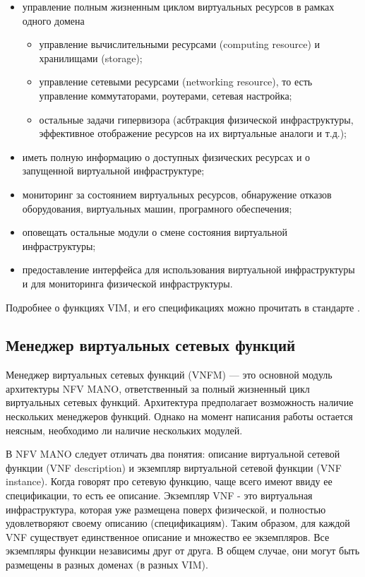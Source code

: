 \documentclass[oneside,final,14pt,a4paper]{extreport}
\begin{document}
\begin{itemize}
	\item управление полным жизненным циклом виртуальных ресурсов в рамках одного домена
	\begin{itemize}
		\item управление вычислительными ресурсами (computing resource) и хранилищами (storage);
		\item управление сетевыми ресурсами (networking resource), то есть управление коммутаторами, роутерами, сетевая настройка;
		\item остальные задачи гипервизора (асбтракция физической инфраструктуры, эффективное отображение ресурсов на их виртуальные аналоги и т.д.);
	\end{itemize}
	\item иметь полную информацию о доступных физических ресурсах и о запущенной виртуальной инфраструктуре;
	\item мониторинг за состоянием виртуальных ресурсов, обнаружение отказов оборудования, виртуальных машин, програмного обеспечения;
	\item оповещать остальные модули о смене состояния виртуальной инфраструктуры;
	\item предоставление интерфейса для использования виртуальной инфраструктуры и для мониторинга физической инфраструктуры.
\end{itemize}

Подробнее о функциях VIM, и его спецификациях можно прочитать в стандарте \cite{nfv-mano-official-2016-04}.

\subsection{Менеджер виртуальных сетевых функций}
Менеджер виртуальных сетевых функций (VNFM) --- это основной модуль архитектуры NFV MANO, ответственный за  полный жизненный цикл виртуальных сетевых функций. Архитектура предполагает возможность наличие нескольких менеджеров функций. Однако на момент написания работы остается неясным, необходимо ли наличие нескольких модулей.

В NFV MANO следует отличать два понятия: описание виртуальной сетевой функции (VNF description) и экземпляр виртуальной сетевой функции (VNF instance). Когда говорят про сетевую функцию, чаще всего имеют ввиду ее спецификации, то есть ее описание. Экземпляр VNF - это виртуальная инфраструктура, которая уже размещена поверх физической, и полностью удовлетворяют своему описанию (спецификациям). Таким образом, для каждой VNF существует единственное описание и множество ее экземпляров. Все экземпляры функции независимы друг от друга. В общем случае, они могут быть размещены в разных доменах (в разных VIM).
\end{document}
